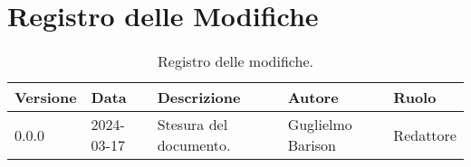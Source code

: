 \section*{Registro delle Modifiche}
\begin{table}[ht!]	
	\centering
	\begin{tabular}{p{1.2cm} p{2cm} p{6cm} p{3cm} p{2cm}}
		\toprule
		\textbf{Versione}& \textbf{Data} & \textbf{Descrizione} & \textbf{Autore} & \textbf{Ruolo} \\
		\midrule
		0.0.0 & 2024-03-17 & Stesura del documento.  & Guglielmo Barison & Redattore \\
		\bottomrule
	\end{tabular}
	\caption{Registro delle modifiche.}
	\label{table:Registro delle modifiche}
\end{table}
\newpage

